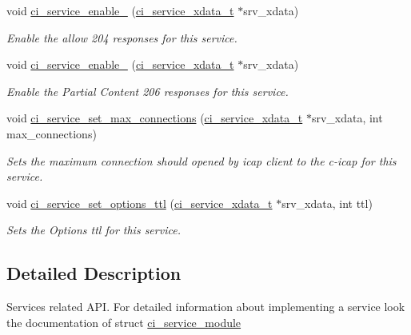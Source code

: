\begin{DoxyCompactItemize}
void \hyperlink{group__SERVICES_gafbb687c7869176c56b9217a61f400a9c}{ci\_\-service\_\-enable\_} (\hyperlink{group__SERVICES_ga033e7bb0a88b3619abbc17230ad98eb4}{ci\_\-service\_\-xdata\_\-t} $\ast$srv\_\-xdata)
\begin{DoxyCompactList}\small\item\em Enable the allow 204 responses for this service. \item\end{DoxyCompactList}\item 
void \hyperlink{group__SERVICES_gac2b4f2ae3dfdf1718b5a7ce5418a8e62}{ci\_\-service\_\-enable\_} (\hyperlink{group__SERVICES_ga033e7bb0a88b3619abbc17230ad98eb4}{ci\_\-service\_\-xdata\_\-t} $\ast$srv\_\-xdata)
\begin{DoxyCompactList}\small\item\em Enable the Partial Content 206 responses for this service. \item\end{DoxyCompactList}\item 
void \hyperlink{group__SERVICES_ga020a120d936c2061d20bdad2795e81dd}{ci\_\-service\_\-set\_\-max\_\-connections} (\hyperlink{group__SERVICES_ga033e7bb0a88b3619abbc17230ad98eb4}{ci\_\-service\_\-xdata\_\-t} $\ast$srv\_\-xdata, int max\_\-connections)
\begin{DoxyCompactList}\small\item\em Sets the maximum connection should opened by icap client to the c-\/icap for this service. \item\end{DoxyCompactList}\item 
void \hyperlink{group__SERVICES_gadadb6757c8fee88a00e777bcc231433c}{ci\_\-service\_\-set\_\-options\_\-ttl} (\hyperlink{group__SERVICES_ga033e7bb0a88b3619abbc17230ad98eb4}{ci\_\-service\_\-xdata\_\-t} $\ast$srv\_\-xdata, int ttl)
\begin{DoxyCompactList}\small\item\em Sets the Options ttl for this service. \item\end{DoxyCompactList}\end{DoxyCompactItemize}


\subsection{Detailed Description}
Services related API. For detailed information about implementing a service look the documentation of struct \hyperlink{structci__service__module}{ci\_\-service\_\-module} 

